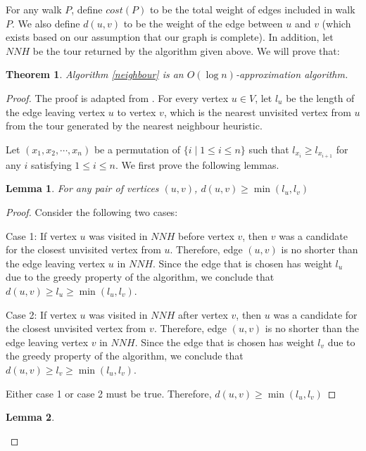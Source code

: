 \documentclass[paper=a4, fontsize=11pt]{scrartcl}	%
\numberwithin{equation}{section}		%
\numberwithin{figure}{section}			%
\numberwithin{table}{section}				%
\newtheorem{theorem}{Theorem}
\newtheorem{lemma}{Lemma}
\begin{document}
For any walk $P$, define $cost(P)$ to be the total weight of edges included in walk $P$. We also define $d(u,v)$ to be the weight of the edge between $u$ and $v$ (which exists based on our assumption that our graph is complete). In addition, let $NNH$ be the tour returned by the algorithm given above. We will prove that:

\begin{theorem}
Algorithm \ref{neighbour} is an $O(\log n)$-approximation algorithm.
\end{theorem}

\begin{proof}
The proof is adapted from \cite{ravi}. For every vertex $u\in V$, let $l_{u}$ be the length of the edge leaving vertex $u$ to vertex $v$, which is the nearest unvisited vertex from $u$ from the tour generated by the nearest neighbour heuristic.
\item
Let $(x_1, x_2, \cdots, x_n)$ be a permutation of $\{i\mid 1\leq i \leq n\}$ such that $l_{x_i} \geq l_{x_{i+1}}$ for any $i$ satisfying $1\leq i\le n$. We first prove the following lemmas.
\begin{lemma}
For any pair of vertices $(u,v)$, $d(u,v)\geq \min(l_{u},l_{v})$
\end{lemma}
\begin{proof} Consider the following two cases:
\item
Case 1: If vertex $u$ was visited in $NNH$ before vertex $v$, then $v$ was a candidate for the closest unvisited vertex from $u$. Therefore, edge $(u,v)$ is no shorter than the edge leaving vertex $u$ in $NNH$. Since the edge that is chosen has weight $l_{u}$ due to the greedy property of the algorithm, we conclude that $d(u,v)\geq l_{u}\geq \min(l_{u},l_{v})$.
\item
Case 2: If vertex $u$ was visited in $NNH$ after vertex $v$, then $u$ was a candidate for the closest unvisited vertex from $v$. Therefore, edge $(u,v)$ is no shorter than the edge leaving vertex $v$ in $NNH$. Since the edge that is chosen has weight $l_{v}$ due to the greedy property of the algorithm, we conclude that $d(u,v)\geq l_{v}\geq \min(l_{u},l_{v})$.
\item Either case 1 or case 2 must be true. Therefore, $d(u,v)\geq \min(l_{u},l_{v})$
\end{proof}
\begin{lemma}


\end{lemma}
\end{proof}
\end{document}
